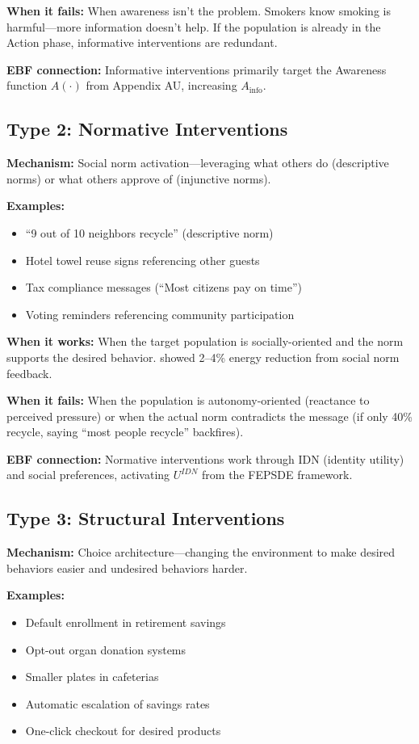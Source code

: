 \textbf{When it fails:} When awareness isn't the problem. Smokers know smoking is harmful---more information doesn't help. If the population is already in the Action phase, informative interventions are redundant.

\textbf{EBF connection:} Informative interventions primarily target the Awareness function $A(\cdot)$ from Appendix AU, increasing $A_{\text{info}}$.

\subsection{Type 2: Normative Interventions}

\textbf{Mechanism:} Social norm activation---leveraging what others do (descriptive norms) or what others approve of (injunctive norms).

\textbf{Examples:}
\begin{itemize}[nosep]
\item ``9 out of 10 neighbors recycle'' (descriptive norm)
\item Hotel towel reuse signs referencing other guests
\item Tax compliance messages (``Most citizens pay on time'')
\item Voting reminders referencing community participation
\end{itemize}

\textbf{When it works:} When the target population is socially-oriented and the norm supports the desired behavior. \citet{allcott2011} showed 2--4\% energy reduction from social norm feedback.

\textbf{When it fails:} When the population is autonomy-oriented (reactance to perceived pressure) or when the actual norm contradicts the message (if only 40\% recycle, saying ``most people recycle'' backfires).

\textbf{EBF connection:} Normative interventions work through IDN (identity utility) and social preferences, activating $U^{IDN}$ from the FEPSDE framework.

\subsection{Type 3: Structural Interventions}

\textbf{Mechanism:} Choice architecture---changing the environment to make desired behaviors easier and undesired behaviors harder.

\textbf{Examples:}
\begin{itemize}[nosep]
\item Default enrollment in retirement savings \citep{madrian2001}
\item Opt-out organ donation systems
\item Smaller plates in cafeterias
\item Automatic escalation of savings rates
\item One-click checkout for desired products
\end{itemize}

